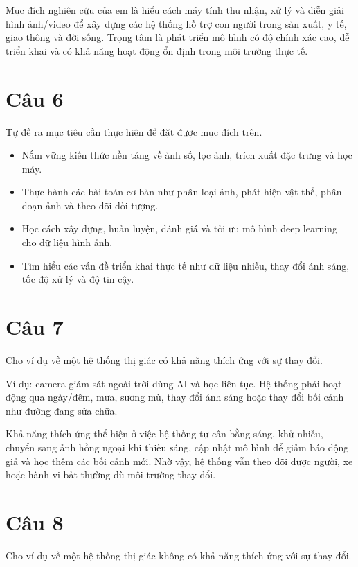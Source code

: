 Mục đích nghiên cứu của em là hiểu cách máy tính thu nhận, xử lý và diễn giải hình ảnh/video để xây dựng các hệ thống hỗ trợ con người trong sản xuất, y tế, giao thông và đời sống. Trọng tâm là phát triển mô hình có độ chính xác cao, dễ triển khai và có khả năng hoạt động ổn định trong môi trường thực tế.

\section*{Câu 6}
Tự đề ra mục tiêu cần thực hiện để đặt được mục đích trên.

\begin{itemize}
    \item Nắm vững kiến thức nền tảng về ảnh số, lọc ảnh, trích xuất đặc trưng và học máy.
    \item Thực hành các bài toán cơ bản như phân loại ảnh, phát hiện vật thể, phân đoạn ảnh và theo dõi đối tượng.
    \item Học cách xây dựng, huấn luyện, đánh giá và tối ưu mô hình deep learning cho dữ liệu hình ảnh.
    \item Tìm hiểu các vấn đề triển khai thực tế như dữ liệu nhiễu, thay đổi ánh sáng, tốc độ xử lý và độ tin cậy.
\end{itemize}

\section*{Câu 7}
Cho ví dụ về một hệ thống thị giác có khả năng thích ứng với sự thay đổi.

Ví dụ: camera giám sát ngoài trời dùng AI và học liên tục. Hệ thống phải hoạt động qua ngày/đêm, mưa, sương mù, thay đổi ánh sáng hoặc thay đổi bối cảnh như đường đang sửa chữa.

Khả năng thích ứng thể hiện ở việc hệ thống tự cân bằng sáng, khử nhiễu, chuyển sang ảnh hồng ngoại khi thiếu sáng, cập nhật mô hình để giảm báo động giả và học thêm các bối cảnh mới. Nhờ vậy, hệ thống vẫn theo dõi được người, xe hoặc hành vi bất thường dù môi trường thay đổi.

\section*{Câu 8}
Cho ví dụ về một hệ thống thị giác không có khả năng thích ứng với sự thay đổi.

